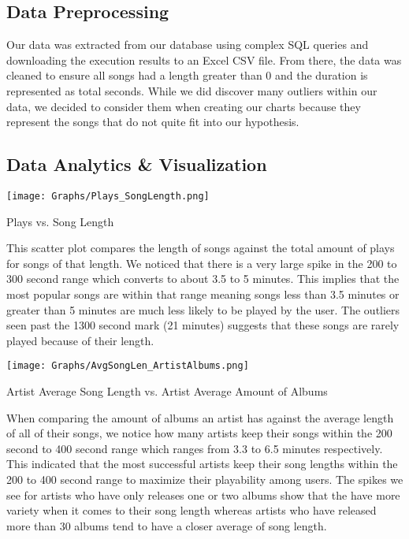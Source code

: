 \documentclass[12pt]{article}
\begin{document}
    \subsection{Data Preprocessing}
    Our data was extracted from our database using complex SQL queries and downloading
    the execution results to an Excel CSV file. From there, the data was cleaned to ensure
    all songs had a length greater than 0 and the duration is represented as total seconds.
    While we did discover many outliers within our data, we decided to consider them when
    creating our charts because they represent the songs that do not quite fit into our
    hypothesis.



    \subsection{Data Analytics \& Visualization}

    \begin{center}
            \texttt{[image: Graphs/Plays\_SongLength.png]}
            \caption{Plays vs. Song Length}
            \label{fig:Graph 1}
    \end{center}


    \vspace{0.5cm}

    \noindent This scatter plot compares the length of songs against the total amount
    of plays for songs of that length. We noticed that there is a very large spike in
    the 200 to 300 second range which converts to about 3.5 to 5 minutes. This implies
    that the most popular songs are within that range meaning songs less than 3.5 minutes
    or greater than 5 minutes are much less likely to be played by the user. The outliers
    seen past the 1300 second mark (21 minutes) suggests that these songs are rarely played
    because of their length.

    \begin{center}
            \texttt{[image: Graphs/AvgSongLen\_ArtistAlbums.png]}
            \caption{Artist Average Song Length vs. Artist Average Amount of Albums}
            \label{fig:Graph 2}
    \end{center}


    \vspace{0.5cm}

    \noindent When comparing the amount of albums an artist has against the average length
    of all of their songs, we notice how many artists keep their songs within the
    200 second to 400 second range which ranges from 3.3 to 6.5 minutes respectively. This
    indicated that the most successful artists keep their song lengths within the
    200 to 400 second range to maximize their playability among users. The spikes we see
    for artists who have only releases one or two albums show that the have more
    variety when it comes to their song length whereas artists who have released more than
    30 albums tend to have a closer average of song length.
\end{document}
